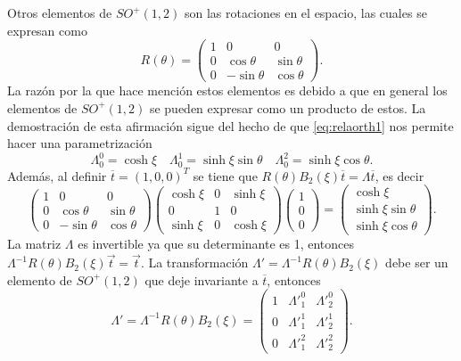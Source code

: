 Otros elementos de $SO^+(1,2)$ son las rotaciones en el espacio, las cuales se expresan como
\begin{equation}
	R(\theta) = \begin{pmatrix}
		1 & 0           & 0          \\
		0 & \cos\theta  & \sin\theta \\
		0 & -\sin\theta & \cos\theta
	\end{pmatrix}.
\end{equation}
La razón por la que hace mención estos elementos es debido a que en general los elementos de $SO^+(1,2)$ se pueden expresar como un producto de estos. La demostración de esta afirmación sigue del hecho de que \eqref{eq:relaorth1} nos permite hacer una parametrización
\begin{equation}
	\Lambda_0^0 = \cosh\xi\quad \Lambda_0^1 = \sinh\xi \sin\theta\quad \Lambda_0^2 = \sinh\xi \cos\theta.
\end{equation}
Además, al definir $\overline{t} = (1,0,0)^{T}$ se tiene que $R(\theta)B_2(\xi)\overline{t}= \Lambda \overline{t}$, es decir
\begin{equation}
	\begin{pmatrix}
		1 & 0            & 0          \\
		0 & \cos\theta   & \sin\theta \\
		0 & - \sin\theta & \cos\theta
	\end{pmatrix}\begin{pmatrix}
		\cosh\xi & 0 & \sinh\xi \\
		0        & 1 & 0        \\
		\sinh\xi & 0 & \cosh\xi
	\end{pmatrix}\begin{pmatrix}
		1 \\0\\0
	\end{pmatrix} = \begin{pmatrix}
		\cosh\xi \\\sinh\xi\sin\theta\\\sinh\xi\cos\theta
	\end{pmatrix}.
\end{equation}
La matriz $\Lambda$ es invertible ya que su determinante es 1, entonces $\Lambda^{-1}R(\theta)B_2(\xi)\vec{t}= \vec{t}$. La transformación $\Lambda' = \Lambda^{-1}R(\theta)B_2(\xi)$ debe ser un elemento de $SO^+(1,2)$ que deje invariante a $\overline{t}$, entonces
\begin{equation}
	\Lambda' = \Lambda^{-1}R(\theta)B_2(\xi) = \begin{pmatrix}
		1 & \Lambda'^0_1 & \Lambda'^0_2 \\
		0 & \Lambda'^1_1 & \Lambda'^1_2 \\
		0 & \Lambda'^2_1 & \Lambda'^2_2
	\end{pmatrix}.
\end{equation}
